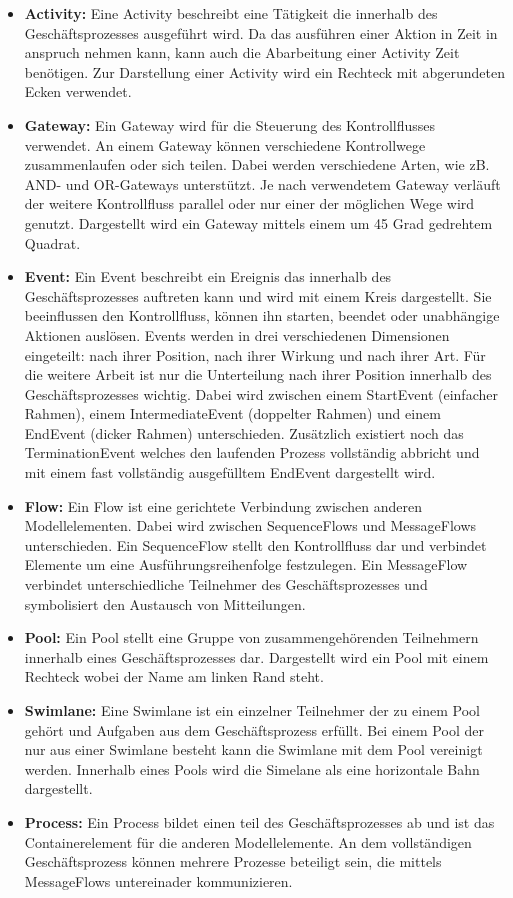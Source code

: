 \begin{itemize}
    \item \textbf{Activity:} 
    Eine Activity beschreibt eine Tätigkeit die innerhalb des Geschäftsprozesses ausgeführt wird.
    Da das ausführen einer Aktion in Zeit in anspruch nehmen kann, kann auch die Abarbeitung einer Activity Zeit benötigen.
    Zur Darstellung einer Activity wird ein Rechteck mit abgerundeten Ecken verwendet.
    \item \textbf{Gateway:}
    Ein Gateway wird für die Steuerung des Kontrollflusses verwendet. 
    An einem Gateway können verschiedene Kontrollwege zusammenlaufen oder sich teilen. 
    Dabei werden verschiedene Arten, wie zB. AND- und OR-Gateways unterstützt. 
    Je nach verwendetem Gateway verläuft der weitere Kontrollfluss parallel oder nur einer der möglichen Wege wird genutzt.
    Dargestellt wird ein Gateway mittels einem um 45 Grad gedrehtem Quadrat. 
    \item \textbf{Event:}
    Ein Event beschreibt ein Ereignis das innerhalb des Geschäftsprozesses auftreten kann und wird mit einem Kreis dargestellt.
    Sie beeinflussen den Kontrollfluss, können ihn starten, beendet oder unabhängige Aktionen auslösen.
    Events werden in drei verschiedenen Dimensionen eingeteilt: nach ihrer Position, nach ihrer Wirkung und nach ihrer Art.
    Für die weitere Arbeit ist nur die Unterteilung nach ihrer Position innerhalb des Geschäftsprozesses wichtig.
    Dabei wird zwischen einem StartEvent (einfacher Rahmen), einem IntermediateEvent (doppelter Rahmen) und einem EndEvent (dicker Rahmen) unterschieden.
    Zusätzlich existiert noch das TerminationEvent welches den laufenden Prozess vollständig abbricht und mit einem fast vollständig ausgefülltem EndEvent dargestellt wird.
    \item \textbf{Flow:}
    Ein Flow ist eine gerichtete Verbindung zwischen anderen Modellelementen.
    Dabei wird zwischen SequenceFlows und MessageFlows unterschieden.
    Ein SequenceFlow stellt den Kontrollfluss dar und verbindet Elemente um eine Ausführungsreihenfolge festzulegen.
    Ein MessageFlow verbindet unterschiedliche Teilnehmer des Geschäftsprozesses und symbolisiert den Austausch von Mitteilungen.
    \item \textbf{Pool:}
    Ein Pool stellt eine Gruppe von zusammengehörenden Teilnehmern innerhalb eines Geschäftsprozesses dar.
    Dargestellt wird ein Pool mit einem Rechteck wobei der Name am linken Rand steht.
    \item \textbf{Swimlane:}
    Eine Swimlane ist ein einzelner Teilnehmer der zu einem Pool gehört und Aufgaben aus dem Geschäftsprozess erfüllt.
    Bei einem Pool der nur aus einer Swimlane besteht kann die Swimlane mit dem Pool vereinigt werden.
    Innerhalb eines Pools wird die Simelane als eine horizontale Bahn dargestellt.
    \item \textbf{Process:}
    Ein Process bildet einen teil des Geschäftsprozesses ab und ist das Containerelement für die anderen Modellelemente.
    An dem vollständigen Geschäftsprozess können mehrere Prozesse beteiligt sein, die mittels MessageFlows untereinader kommunizieren.
\end{itemize}

